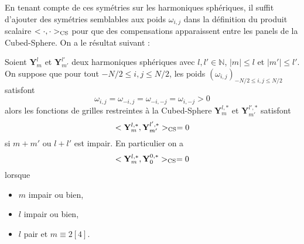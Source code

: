 En tenant compte de ces symétries sur les harmoniques sphériques, il suffit d'ajouter des symétries semblables aux poids $\omega_{i,j}$ dans la définition du produit scalaire $<\cdot, \cdot>_{\text{CS}}$ pour que des compensations apparaissent entre les panels de la Cubed-Sphere. On a le résultat suivant :

\begin{theoreme}
Soient $\mathbf{Y}_m^{l}$ et $\mathbf{Y}_{m'}^{l'}$ deux harmoniques sphériques avec $l, l' \in \mathbb{N}$, $|m| \leq l$ et $|m'| \leq l'$. On suppose que pour tout $-N/2 \leq i,j \leq N/2$, les poids $(\omega_{i,j})_{-N/2 \leq i,j \leq N/2}$ satisfont
\begin{equation}
\omega_{i,j} = \omega_{-i,j} = \omega_{-i,-j} = \omega_{i,-j}>0
\label{eq:sym_omega}
\end{equation}
alors les fonctions de grilles restreintes à la Cubed-Sphere $\mathbf{Y}_m^{l,*}$ et $\mathbf{Y}_{m'}^{l',*}$ satisfont
\begin{equation}
<\mathbf{Y}_{m}^{l,*},\mathbf{Y}_{m'}^{l',*}>_{\text{CS}} = 0 
\end{equation}
si $m+m'$ ou $l+l'$ est impair.
En particulier on a
\begin{equation}
<\mathbf{Y}_{m}^{l,*},\mathbf{Y}_{0}^{0,*}>_{\text{CS}} = 0 
\end{equation}
lorsque
\begin{itemize}
\item $m$ impair ou bien,
\item $l$ impair ou bien,
\item $l$ pair et $m \equiv 2 [4]$.
\end{itemize}
\label{th:pdtscal_HS}
\end{theoreme}

